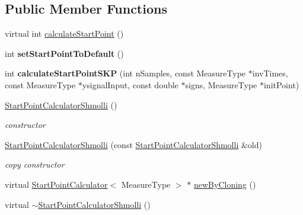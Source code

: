 \subsection*{Public Member Functions}
\begin{DoxyCompactItemize}
\item 
virtual int \hyperlink{class_ox_1_1_start_point_calculator_shmolli_acd0913906ed0d4301b78b5329cc3d62f}{calculate\+Start\+Point} ()
\item 
int {\bfseries set\+Start\+Point\+To\+Default} ()\hypertarget{class_ox_1_1_start_point_calculator_shmolli_ac4e1b932329096fd43f77c4ddf2bd804}{}\label{class_ox_1_1_start_point_calculator_shmolli_ac4e1b932329096fd43f77c4ddf2bd804}

\item 
int {\bfseries calculate\+Start\+Point\+S\+KP} (int n\+Samples, const Measure\+Type $\ast$inv\+Times, const Measure\+Type $\ast$ysignal\+Input, const double $\ast$signs, Measure\+Type $\ast$init\+Point)\hypertarget{class_ox_1_1_start_point_calculator_shmolli_aaf776712e300b190928e793eec54cc47}{}\label{class_ox_1_1_start_point_calculator_shmolli_aaf776712e300b190928e793eec54cc47}

\item 
\hyperlink{class_ox_1_1_start_point_calculator_shmolli_afc823088ce6d5d0ac3e1eec161ede9e2}{Start\+Point\+Calculator\+Shmolli} ()\hypertarget{class_ox_1_1_start_point_calculator_shmolli_afc823088ce6d5d0ac3e1eec161ede9e2}{}\label{class_ox_1_1_start_point_calculator_shmolli_afc823088ce6d5d0ac3e1eec161ede9e2}

\begin{DoxyCompactList}\small\item\em constructor \end{DoxyCompactList}\item 
\hyperlink{class_ox_1_1_start_point_calculator_shmolli_a65b9fc02c5e9483e9b3b39ee0962e201}{Start\+Point\+Calculator\+Shmolli} (const \hyperlink{class_ox_1_1_start_point_calculator_shmolli}{Start\+Point\+Calculator\+Shmolli} \&old)\hypertarget{class_ox_1_1_start_point_calculator_shmolli_a65b9fc02c5e9483e9b3b39ee0962e201}{}\label{class_ox_1_1_start_point_calculator_shmolli_a65b9fc02c5e9483e9b3b39ee0962e201}

\begin{DoxyCompactList}\small\item\em copy constructor \end{DoxyCompactList}\item 
virtual \hyperlink{class_ox_1_1_start_point_calculator}{Start\+Point\+Calculator}$<$ Measure\+Type $>$ $\ast$ \hyperlink{class_ox_1_1_start_point_calculator_shmolli_ab3f7f6efa7fb6ac4ce1a93fb7ec42f85}{new\+By\+Cloning} ()
\item 
virtual \hyperlink{class_ox_1_1_start_point_calculator_shmolli_aaede509b017e5da6102a230ad979539a}{$\sim$\+Start\+Point\+Calculator\+Shmolli} ()\hypertarget{class_ox_1_1_start_point_calculator_shmolli_aaede509b017e5da6102a230ad979539a}{}\label{class_ox_1_1_start_point_calculator_shmolli_aaede509b017e5da6102a230ad979539a}


\end{DoxyCompactItemize}
